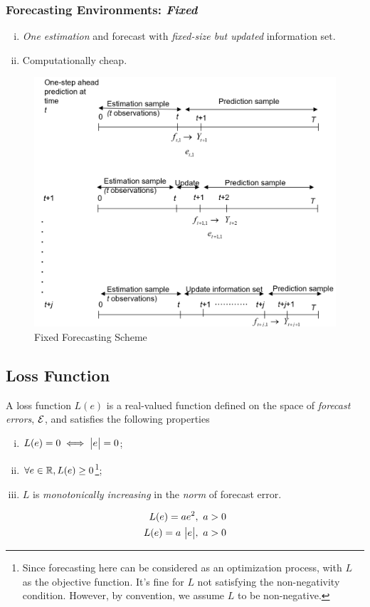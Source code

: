 \documentclass[11pt]{article}
\begin{document}
		\subsubsection{Forecasting Environments: \emph{Fixed}}
			\begin{enumerate}[(i)]
				\item \emph{One estimation} and forecast with \emph{fixed-size but updated} information set.
				\item Computationally cheap.
			\end{enumerate}
			\begin{figure}[H]
				\centering
				\includegraphics[width=0.5\linewidth]{figures/fixed_forecast}
				\caption{Fixed Forecasting Scheme}
			\end{figure}
	\subsection{Loss Function}
		\begin{definition}
			A loss function $L(e)$ is a real-valued function defined on the space of \emph{forecast errors}, $\mathcal{{E}}$, and satisfies the following properties
			\begin{enumerate}[(i)]
				\item $L(e) = 0 \iff \big \vert {e} \big \vert = 0$;
				\item $\forall e \in \mathbb{R}, L(e) \geq 0$\footnote{Since forecasting here can be considered as an optimization process, with $L$ as the objective function. It's fine for $L$ not satisfying the non-negativity condition. However, by convention, we assume $L$ to be non-negative.};
				\item $L$ is \emph{monotonically increasing} in the \emph{norm} of forecast error.
			\end{enumerate}
		\end{definition}
		
		\begin{example}
			\begin{align}
				L(e) = a e^2,\ a > 0 \\
				L(e) = a\ \big \vert {e} \big \vert,\ a > 0
			\end{align}
		\end{example}
		
\end{document}
